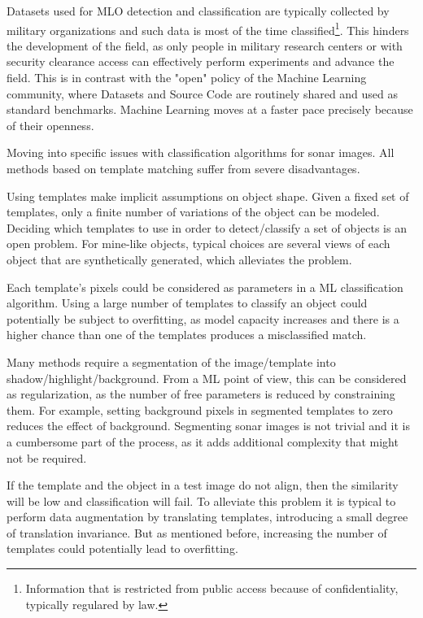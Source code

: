 Datasets used for MLO detection and classification are typically collected by military organizations and such data is most of the time classified\footnote{Information that is restricted from public access because of confidentiality, typically regulared by law.}. This hinders the development of the field, as only people in military research centers or with security clearance access can effectively perform experiments and advance the field. This is in contrast with the "open" policy of the Machine Learning community, where Datasets and Source Code are routinely shared and used as standard benchmarks. Machine Learning moves at a faster pace precisely because of their openness.

Moving into specific issues with classification algorithms for sonar images. All methods based on template matching suffer from severe disadvantages.

Using templates make implicit assumptions on object shape. Given a fixed set of templates, only a finite number of variations of the object can be modeled. Deciding which templates to use in order to detect/classify a set of objects is an open problem. For mine-like objects, typical choices are several views of each object that are synthetically generated, which alleviates the problem.

Each template's pixels could be considered as parameters in a ML classification algorithm. Using a large number of templates to classify an object could potentially be subject to overfitting, as model capacity increases and there is a higher chance than one of the templates produces a misclassified match.

Many methods require a segmentation of the image/template into shadow/highlight/background. From a ML point of view, this can be considered as regularization, as the number of free parameters is reduced by constraining them. For example, setting background pixels in segmented templates to zero reduces the effect of background. Segmenting sonar images is not trivial and it is a cumbersome part of the process, as it adds additional complexity that might not be required.

If the template and the object in a test image do not align, then the similarity will be low and classification will fail. To alleviate this problem it is typical to perform data augmentation by translating templates, introducing a small degree of translation invariance. But as mentioned before, increasing the number of templates could potentially lead to overfitting.

